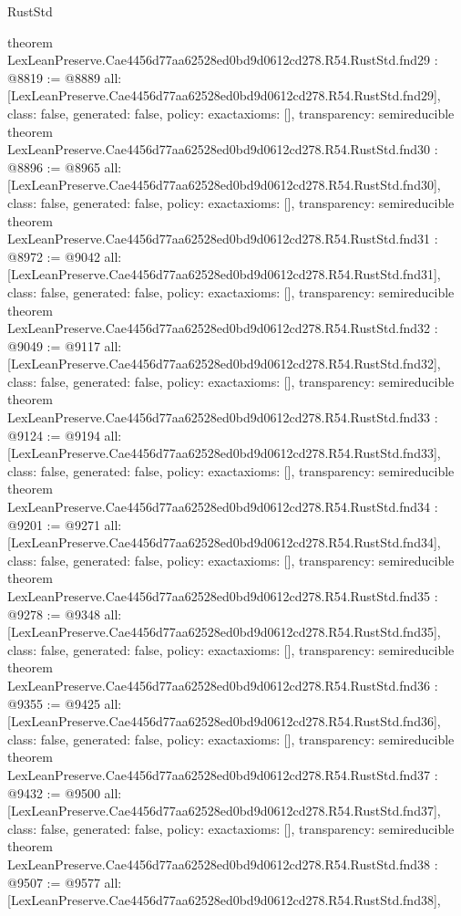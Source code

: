 \begin{lexlean}{RustStd}
\begin{coremodule}
{}
theorem LexLeanPreserve.Cae4456d77aa62528ed0bd9d0612cd278.R54.RustStd.fnd29 : @8819 := @8889 {
  all: [LexLeanPreserve.Cae4456d77aa62528ed0bd9d0612cd278.R54.RustStd.fnd29],
  class: false,
  generated: false,
  policy: exact{axioms: []},
  transparency: semireducible
}
theorem LexLeanPreserve.Cae4456d77aa62528ed0bd9d0612cd278.R54.RustStd.fnd30 : @8896 := @8965 {
  all: [LexLeanPreserve.Cae4456d77aa62528ed0bd9d0612cd278.R54.RustStd.fnd30],
  class: false,
  generated: false,
  policy: exact{axioms: []},
  transparency: semireducible
}
theorem LexLeanPreserve.Cae4456d77aa62528ed0bd9d0612cd278.R54.RustStd.fnd31 : @8972 := @9042 {
  all: [LexLeanPreserve.Cae4456d77aa62528ed0bd9d0612cd278.R54.RustStd.fnd31],
  class: false,
  generated: false,
  policy: exact{axioms: []},
  transparency: semireducible
}
theorem LexLeanPreserve.Cae4456d77aa62528ed0bd9d0612cd278.R54.RustStd.fnd32 : @9049 := @9117 {
  all: [LexLeanPreserve.Cae4456d77aa62528ed0bd9d0612cd278.R54.RustStd.fnd32],
  class: false,
  generated: false,
  policy: exact{axioms: []},
  transparency: semireducible
}
theorem LexLeanPreserve.Cae4456d77aa62528ed0bd9d0612cd278.R54.RustStd.fnd33 : @9124 := @9194 {
  all: [LexLeanPreserve.Cae4456d77aa62528ed0bd9d0612cd278.R54.RustStd.fnd33],
  class: false,
  generated: false,
  policy: exact{axioms: []},
  transparency: semireducible
}
theorem LexLeanPreserve.Cae4456d77aa62528ed0bd9d0612cd278.R54.RustStd.fnd34 : @9201 := @9271 {
  all: [LexLeanPreserve.Cae4456d77aa62528ed0bd9d0612cd278.R54.RustStd.fnd34],
  class: false,
  generated: false,
  policy: exact{axioms: []},
  transparency: semireducible
}
theorem LexLeanPreserve.Cae4456d77aa62528ed0bd9d0612cd278.R54.RustStd.fnd35 : @9278 := @9348 {
  all: [LexLeanPreserve.Cae4456d77aa62528ed0bd9d0612cd278.R54.RustStd.fnd35],
  class: false,
  generated: false,
  policy: exact{axioms: []},
  transparency: semireducible
}
theorem LexLeanPreserve.Cae4456d77aa62528ed0bd9d0612cd278.R54.RustStd.fnd36 : @9355 := @9425 {
  all: [LexLeanPreserve.Cae4456d77aa62528ed0bd9d0612cd278.R54.RustStd.fnd36],
  class: false,
  generated: false,
  policy: exact{axioms: []},
  transparency: semireducible
}
theorem LexLeanPreserve.Cae4456d77aa62528ed0bd9d0612cd278.R54.RustStd.fnd37 : @9432 := @9500 {
  all: [LexLeanPreserve.Cae4456d77aa62528ed0bd9d0612cd278.R54.RustStd.fnd37],
  class: false,
  generated: false,
  policy: exact{axioms: []},
  transparency: semireducible
}
theorem LexLeanPreserve.Cae4456d77aa62528ed0bd9d0612cd278.R54.RustStd.fnd38 : @9507 := @9577 {
  all: [LexLeanPreserve.Cae4456d77aa62528ed0bd9d0612cd278.R54.RustStd.fnd38],
}
\end{coremodule}
\end{lexlean}
